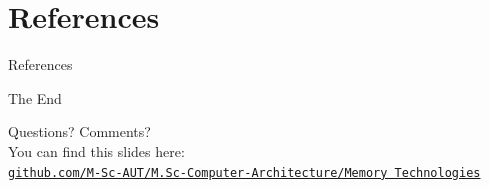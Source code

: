\documentclass{beamer}
\begin{document}
%
%
%
%
%
%
%
%
%
%	
%	 	
%	 	
%
%
%
%
%
%
%
%
%
%
%
%
%
%
%
\section{References}

\begin{frame}{References}

\hyperlink{start}{}

\nocite{bibitem1}
\nocite{*}
 


\end{frame}






\begin{frame}[plain]
	\begin{center}
		{\Huge The End}
		
		\bigskip\bigskip %
		
		{\LARGE Questions? Comments?}\\
		You can find this slides here:\\
		\textcolor{red}{\href{https://github.com/M-Sc-AUT/M.Sc-Computer-Architecture/tree/main/Memory Technologies}{\texttt{github.com/M-Sc-AUT/M.Sc-Computer-Architecture/Memory Technologies}}}
	\end{center}
\end{frame}
\end{document}
